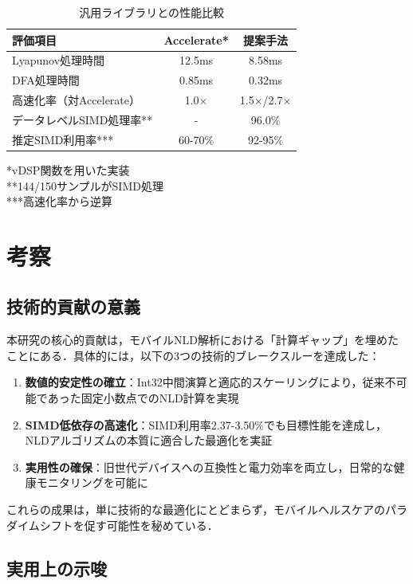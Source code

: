 \documentclass[paper]{ieice}
\begin{document}
\begin{table}[t]
\caption{汎用ライブラリとの性能比較}
\label{tab:library_comparison}
\centering
\begin{tabular}{lcc}
\toprule
評価項目 & Accelerate* & 提案手法 \\
\midrule
Lyapunov処理時間 & 12.5ms & 8.58ms \\
DFA処理時間 & 0.85ms & 0.32ms \\
高速化率（対Accelerate） & 1.0× & 1.5×/2.7× \\
データレベルSIMD処理率** & - & 96.0\% \\
推定SIMD利用率*** & 60-70\% & 92-95\% \\
\bottomrule
\end{tabular}
\vspace{1mm}
\footnotesize{*vDSP関数を用いた実装}\\
\footnotesize{**144/150サンプルがSIMD処理}\\
\footnotesize{***高速化率から逆算}
\end{table}

\section{考察}

\subsection{技術的貢献の意義}

本研究の核心的貢献は，モバイルNLD解析における「計算ギャップ」を埋めたことにある．具体的には，以下の3つの技術的ブレークスルーを達成した：

\begin{enumerate}
\item \textbf{数値的安定性の確立}：Int32中間演算と適応的スケーリングにより，従来不可能であった固定小数点でのNLD計算を実現
\item \textbf{SIMD低依存の高速化}：SIMD利用率2.37-3.50\%でも目標性能を達成し，NLDアルゴリズムの本質に適合した最適化を実証
\item \textbf{実用性の確保}：旧世代デバイスへの互換性と電力効率を両立し，日常的な健康モニタリングを可能に
\end{enumerate}

これらの成果は，単に技術的な最適化にとどまらず，モバイルヘルスケアのパラダイムシフトを促す可能性を秘めている．

\subsection{実用上の示唆}
\end{document}
